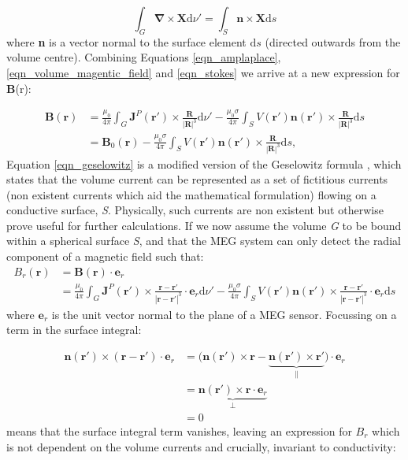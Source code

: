 \begin{equation}
	\int_G\mathbf{\nabla}\times\mathbf{X}\text{d}\nu'=\int_S\mathbf{n}\times\mathbf{X}\text{d}s 
\end{equation} where \textbf{n} is a vector normal to the surface element $\text{d}s$ (directed outwards from the volume centre). Combining Equations \ref{eqn_amplaplace}, \ref{eqn_volume_magentic_field} and \ref{eqn_stokes} we arrive at a new expression for \textbf{B}(r):

\begin{equation}
\begin{aligned}
	\mathbf{B}(\mathbf{r}) &= \frac{\mu_0}{4\pi}\int_{G}\mathbf{J}^P(\mathbf{r}')\times\frac{\mathbf{R}}{|\mathbf{R}|^3}\text{d}\nu' - \frac{\mu_0\sigma}{4\pi}\int_SV(\mathbf{r}')\mathbf{n}(\mathbf{r}')\times\frac{\mathbf{R}}{|\mathbf{R}|^3}\text{d}s \\ 
	&= \mathbf{B}_0(\mathbf{r}) - \frac{\mu_0\sigma}{4\pi}\int_SV(\mathbf{r}')\mathbf{n}(\mathbf{r}')\times\frac{\mathbf{R}}{|\mathbf{R}|^3}\text{d}s,
	\label{eqn_geselowitz}
	\end{aligned}
\end{equation} Equation \ref{eqn_geselowitz} is a modified version of the Geselowitz formula \citep{Geselowitz1970}, which states that the volume current can be represented as a set of fictitious currents (non existent currents which aid the mathematical formulation) flowing on a conductive surface, \textit{S}. Physically, such currents are non existent but otherwise prove useful for further calculations. If we now assume the volume \textit{G} to be bound within a spherical surface \textit{S}, and that the MEG system can only detect the radial component of a magnetic field such that:
\begin{equation}
\begin{aligned}
B_r(\mathbf{r}) &= \mathbf{B}(\mathbf{r})\cdot\mathbf{e}_r \\
& = \frac{\mu_0}{4\pi}\int_{G}\mathbf{J}^P(\mathbf{r}')\times\frac{\mathbf{r}-\mathbf{r}'}{|\mathbf{r}-\mathbf{r}'|^3}\cdot\mathbf{e}_r\text{d}\nu' - \frac{\mu_0\sigma}{4\pi}\int_SV(\mathbf{r}')\mathbf{n}(\mathbf{r}')\times\frac{\mathbf{r}-\mathbf{r}'}{|\mathbf{r}-\mathbf{r}'|^3}\cdot\mathbf{e}_r\text{d}s
\end{aligned}
\end{equation} where $\mathbf{e}_r$ is the unit vector normal to the plane of a MEG sensor. Focussing on a term in the surface integral:

\begin{equation}
\begin{aligned}
 \mathbf{n}(\mathbf{r}')\times(\mathbf{r}-\mathbf{r}')\cdot\mathbf{e}_r &= \Big(\mathbf{n}(\mathbf{r}')\times\mathbf{r}-\underset{\parallel}{\underbrace{\mathbf{n}(\mathbf{r}')\times\mathbf{r}'}}\Big)\cdot\mathbf{e}_r \\
 &=\underset{\perp}{\underbrace{\mathbf{n}(\mathbf{r}')\times\mathbf{r}\cdot\mathbf{e}_r}} \\
 &=0
 \end{aligned} 
\end{equation} means that the surface integral term vanishes, leaving an expression for $B_r$ which is not dependent on the volume currents and crucially, invariant to conductivity:

